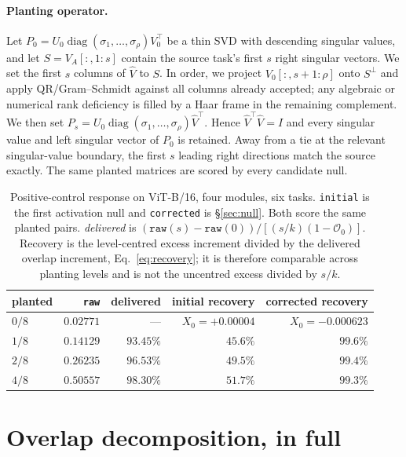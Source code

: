 \paragraph{Planting operator.}
Let $P_0=U_0\operatorname{diag}(\sigma_1,\ldots,\sigma_\rho)V_0^\top$ be a thin SVD with
descending singular values, and let $S=V_A[:,1{:}s]$ contain the source task's first $s$ right
singular vectors. We set the first $s$ columns of $\widehat V$ to $S$. In order, we project
$V_0[:,s{+}1{:}\rho]$ onto $S^\perp$ and apply QR/Gram--Schmidt against all columns already
accepted; any algebraic or numerical rank deficiency is filled by a Haar frame in the remaining
complement. We then set
$P_s=U_0\operatorname{diag}(\sigma_1,\ldots,\sigma_\rho)\widehat V^\top$. Hence
$\widehat V^\top\widehat V=I$ and every singular value and left singular vector of $P_0$ is
retained. Away from a tie at the relevant singular-value boundary, the first $s$ leading right
directions match the source exactly. The same planted matrices are scored by every candidate null.

\begin{table}[h]
\centering
\caption{Positive-control response on ViT-B/16, four modules, six tasks. \texttt{initial} is
the first activation null and \texttt{corrected} is \S\ref{sec:null}. Both score the same planted
pairs. \emph{delivered} is
$(\texttt{raw}(s)-\texttt{raw}(0))/[(s/k)(1-\mathcal O_0)]$. Recovery is the
level-centred excess increment divided by the delivered overlap increment, Eq.~\ref{eq:recovery};
it is therefore comparable across planting levels and is not the uncentred excess divided by
$s/k$.}
\label{tab:power}
\begin{tabular}{@{}lrrrr@{}}
\toprule
planted & \texttt{raw} & delivered & initial recovery & corrected recovery \\
\midrule
$0/8$ & $0.02771$ & --- & $X_0=+0.00004$ & $X_0=-0.000623$ \\
$1/8$ & $0.14129$ & $93.45\%$ & $45.6\%$ & $99.6\%$ \\
$2/8$ & $0.26235$ & $96.53\%$ & $49.5\%$ & $99.4\%$ \\
$4/8$ & $0.50557$ & $98.30\%$ & $51.7\%$ & $99.3\%$ \\
\bottomrule
\end{tabular}
\end{table}

\section{Overlap decomposition, in full}
\label{app:main}

